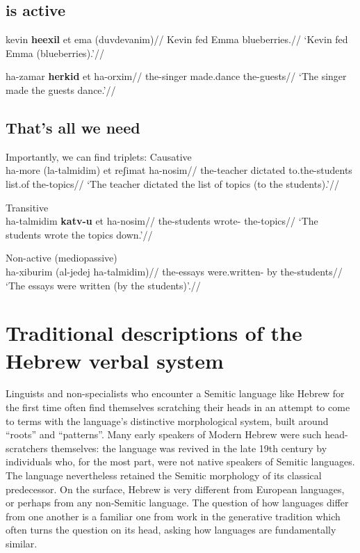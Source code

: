 	\subsection{{\thif} is active}
\pex
	\a \begingl
		\gla kevin \textbf{heexil} et ema (duvdevanim)//
		\glb Kevin fed  Emma blueberries.//
		\glft `Kevin fed Emma (blueberries).'//
	\endgl %
		
	\a \begingl
		\gla ha-zamar \textbf{herkid} et ha-orxim//
		\glb the-singer made.dance  the-guests//
		\glft `The singer made the guests dance.'//
	\endgl
\xe

\newpage
	\subsection{That's all we need}
\pex Importantly, we can find triplets:
	\a Causative {\thif}\\
		\begingl
		\gla ha-more  (la-talmidim) et reʃimat ha-nosim//
		\glb the-teacher dictated to.the-students  list.of the-topics//
		\glft `The teacher dictated the list of topics (to the students).'//
	\endgl
	
	\a Transitive {\tkal}\\
		\begingl
		\gla ha-talmidim \textbf{katv-u} et ha-nosim//
		\glb the-students wrote-  the-topics//
		\glft `The students wrote the topics down.'//
	\endgl
	
	\a Non-active (mediopassive) {\tnif}\\
		\begingl
		\gla ha-xiburim  (al-jedej ha-talmidim)//
		\glb the-essays were.written- by the-students//
		\glft `The essays were written (by the students)'.//
	\endgl
\xe



\section{Traditional descriptions of the Hebrew verbal system} \label{sec:tradition}
Linguists and non-specialists who encounter a Semitic language like Hebrew for the first time often find themselves scratching their heads in an attempt to come to terms with the language's distinctive morphological system, built around ``roots'' and ``patterns''. Many early speakers of Modern Hebrew were such head-scratchers themselves: the language was revived in the late 19th century by individuals who, for the most part, were not native speakers of Semitic languages. The language nevertheless retained the Semitic morphology of its classical predecessor. On the surface, Hebrew is very different from European languages, or perhaps from any non-Semitic language. The question of how languages differ from one another is a familiar one from work in the generative tradition which often turns the question on its head, asking how languages are fundamentally similar.

